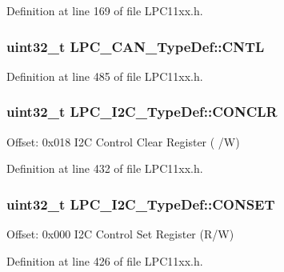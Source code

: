 Definition at line 169 of file L\+P\+C11xx.\+h.

\subsubsection[{\texorpdfstring{C\+N\+TL}{CNTL}}]{ uint32\+\_\+t L\+P\+C\+\_\+\+C\+A\+N\+\_\+\+Type\+Def\+::\+C\+N\+TL}\hypertarget{group___l_p_c11xx___definitions_ga8add56ab65690f15125719eb9eda4470}{}\label{group___l_p_c11xx___definitions_ga8add56ab65690f15125719eb9eda4470}


Definition at line 485 of file L\+P\+C11xx.\+h.

\subsubsection[{\texorpdfstring{C\+O\+N\+C\+LR}{CONCLR}}]{ uint32\+\_\+t L\+P\+C\+\_\+\+I2\+C\+\_\+\+Type\+Def\+::\+C\+O\+N\+C\+LR}\hypertarget{group___l_p_c11xx___definitions_ga8dcac209a164a265abcbfe49c1b80355}{}\label{group___l_p_c11xx___definitions_ga8dcac209a164a265abcbfe49c1b80355}
Offset\+: 0x018 I2C Control Clear Register ( /W) 

Definition at line 432 of file L\+P\+C11xx.\+h.

\subsubsection[{\texorpdfstring{C\+O\+N\+S\+ET}{CONSET}}]{ uint32\+\_\+t L\+P\+C\+\_\+\+I2\+C\+\_\+\+Type\+Def\+::\+C\+O\+N\+S\+ET}\hypertarget{group___l_p_c11xx___definitions_ga50ba10a49a23a16fc3ff26d0ec702a1d}{}\label{group___l_p_c11xx___definitions_ga50ba10a49a23a16fc3ff26d0ec702a1d}
Offset\+: 0x000 I2C Control Set Register (R/W) 

Definition at line 426 of file L\+P\+C11xx.\+h.

